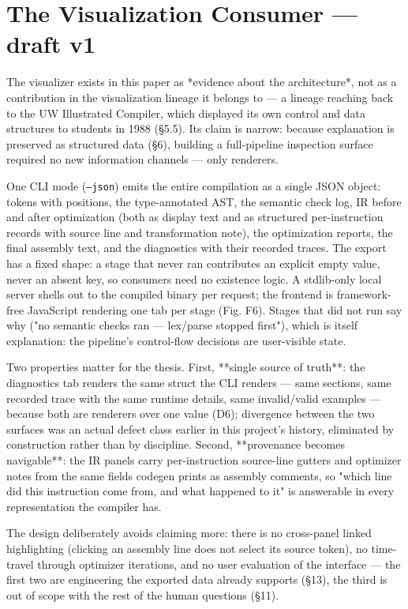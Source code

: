 \section{The Visualization Consumer --- draft v1}
\label{sec:visualizer}

The visualizer exists in this paper as *evidence about the
architecture*, not as a contribution in the visualization lineage it
belongs to --- a lineage reaching back to the UW Illustrated Compiler,
which displayed its own control and data structures to students in
1988 \cite{andrews1988uw} (\S5.5). Its claim is narrow: because explanation is
preserved as structured data (\S6), building a full-pipeline
inspection surface required no new information channels --- only
renderers.

One CLI mode (\texttt{--json}) emits the entire compilation as a single
JSON object: tokens with positions, the type-annotated AST, the
semantic check log, IR before and after optimization (both as
display text and as structured per-instruction records with source
line and transformation note), the optimization reports, the final
assembly text, and the diagnostics with their recorded traces. The
export has a fixed shape: a stage that never ran contributes an
explicit empty value, never an absent key, so consumers need no
existence logic. A stdlib-only local server shells out to the
compiled binary per request; the frontend is framework-free
JavaScript rendering one tab per stage (Fig. F6). Stages that did
not run say why ("no semantic checks ran --- lex/parse stopped
first"), which is itself explanation: the pipeline's control-flow
decisions are user-visible state.

Two properties matter for the thesis. First, **single source of
truth**: the diagnostics tab renders the same struct the CLI
renders --- same sections, same recorded trace with the same runtime
details, same invalid/valid examples --- because both are renderers
over one value (D6); divergence between the two surfaces was an
actual defect class earlier in this project's history, eliminated
by construction rather than by discipline. Second, **provenance
becomes navigable**: the IR panels carry per-instruction source-line
gutters and optimizer notes from the same fields codegen prints as
assembly comments, so "which line did this instruction come from,
and what happened to it" is answerable in every representation the
compiler has.

The design deliberately avoids claiming more: there is no
cross-panel linked highlighting (clicking an assembly line does not
select its source token), no time-travel through optimizer
iterations, and no user evaluation of the interface --- the first two
are engineering the exported data already supports (\S13), the third
is out of scope with the rest of the human questions (\S11).



